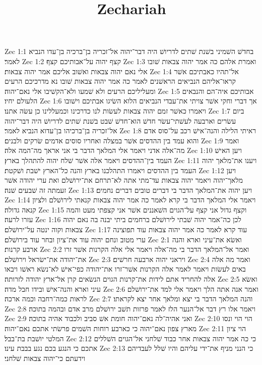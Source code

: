 

\title{Zechariah}

Zec 1:1  בחדשׁ השׁמיני בשׁנת שׁתים לדריושׁ היה דבר־יהוה אל־זכריה בן־ברכיה בן־עדו הנביא לאמר׃
Zec 1:2  קצף יהוה על־אבותיכם קצף׃
Zec 1:3  ואמרת אלהם כה אמר יהוה צבאות שׁובו אלי נאם יהוה צבאות ואשׁוב אליכם אמר יהוה צבאות׃
Zec 1:4  אל־תהיו כאבתיכם אשׁר קראו־אליהם הנביאים הראשׁנים לאמר כה אמר יהוה צבאות שׁובו נא מדרכיכם הרעים ומעליליכם הרעים ולא שׁמעו ולא־הקשׁיבו אלי נאם־יהוה׃
Zec 1:5  אבותיכם איה־הם והנבאים הלעולם יחיו׃
Zec 1:6  אך דברי וחקי אשׁר צויתי את־עבדי הנביאים הלוא השׂיגו אבתיכם וישׁובו ויאמרו כאשׁר זמם יהוה צבאות לעשׂות לנו כדרכינו וכמעללינו כן עשׂה אתנו׃
Zec 1:7  ביום עשׂרים וארבעה לעשׁתי־עשׂר חדשׁ הוא־חדשׁ שׁבט בשׁנת שׁתים לדריושׁ היה דבר־יהוה אל־זכריה בן־ברכיהו בן־עדוא הנביא לאמר׃
Zec 1:8  ראיתי הלילה והנה־אישׁ רכב על־סוס אדם והוא עמד בין ההדסים אשׁר במצלה ואחריו סוסים אדמים שׂרקים ולבנים׃
Zec 1:9  ואמר מה־אלה אדני ויאמר אלי המלאך הדבר בי אני אראך מה־המה אלה׃
Zec 1:10  ויען האישׁ העמד בין־ההדסים ויאמר אלה אשׁר שׁלח יהוה להתהלך בארץ׃
Zec 1:11  ויענו את־מלאך יהוה העמד בין ההדסים ויאמרו התהלכנו בארץ והנה כל־הארץ ישׁבת ושׁקטת׃
Zec 1:12  ויען מלאך־יהוה ויאמר יהוה צבאות עד־מתי אתה לא־תרחם את־ירושׁלם ואת ערי יהודה אשׁר זעמתה זה שׁבעים שׁנה׃
Zec 1:13  ויען יהוה את־המלאך הדבר בי דברים טובים דברים נחמים׃
Zec 1:14  ויאמר אלי המלאך הדבר בי קרא לאמר כה אמר יהוה צבאות קנאתי לירושׁלם ולציון קנאה גדולה׃
Zec 1:15  וקצף גדול אני קצף על־הגוים השׁאננים אשׁר אני קצפתי מעט והמה עזרו לרעה׃
Zec 1:16  לכן כה־אמר יהוה שׁבתי לירושׁלם ברחמים ביתי יבנה בה נאם יהוה צבאות וקוה ינטה על־ירושׁלם׃
Zec 1:17  עוד קרא לאמר כה אמר יהוה צבאות עוד תפוצינה ערי מטוב ונחם יהוה עוד את־ציון ובחר עוד בירושׁלם׃
Zec 2:1  ואשׂא את־עיני וארא והנה ארבע קרנות׃
Zec 2:2  ואמר אל־המלאך הדבר בי מה־אלה ויאמר אלי אלה הקרנות אשׁר זרו את־יהודה את־ישׂראל וירושׁלם׃
Zec 2:3  ויראני יהוה ארבעה חרשׁים׃
Zec 2:4  ואמר מה אלה באים לעשׂות ויאמר לאמר אלה הקרנות אשׁר־זרו את־יהודה כפי־אישׁ לא־נשׂא ראשׁו ויבאו אלה להחריד אתם לידות את־קרנות הגוים הנשׂאים קרן אל־ארץ יהודה לזרותה׃
Zec 2:5  ואשׂא עיני וארא והנה־אישׁ ובידו חבל מדה׃
Zec 2:6  ואמר אנה אתה הלך ויאמר אלי למד את־ירושׁלם לראות כמה־רחבה וכמה ארכה׃
Zec 2:7  והנה המלאך הדבר בי יצא ומלאך אחר יצא לקראתו׃
Zec 2:8  ויאמר אלו רץ דבר אל־הנער הלז לאמר פרזות תשׁב ירושׁלם מרב אדם ובהמה בתוכה׃
Zec 2:9  ואני אהיה־לה נאם־יהוה חומת אשׁ סביב ולכבוד אהיה בתוכה׃
Zec 2:10  הוי הוי ונסו מארץ צפון נאם־יהוה כי כארבע רוחות השׁמים פרשׂתי אתכם נאם־יהוה׃
Zec 2:11  הוי ציון המלטי יושׁבת בת־בבל׃
Zec 2:12  כי כה אמר יהוה צבאות אחר כבוד שׁלחני אל־הגוים השׁללים אתכם כי הנגע בכם נגע בבבת עינו׃
Zec 2:13  כי הנני מניף את־ידי עליהם והיו שׁלל לעבדיהם וידעתם כי־יהוה צבאות שׁלחני׃
